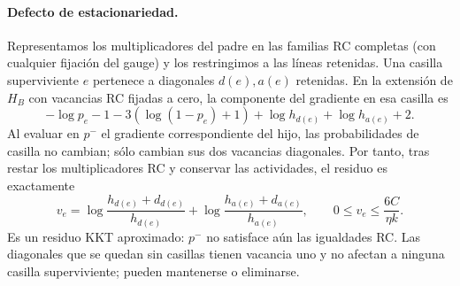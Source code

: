 \paragraph{Defecto de estacionariedad.}
Representamos los multiplicadores del padre en las familias RC completas
(con cualquier fijación del gauge) y los restringimos a las líneas retenidas.
Una casilla superviviente $e$ pertenece a diagonales $d(e),a(e)$ retenidas.
En la extensión de $H_B$ con vacancias RC fijadas a cero, la componente del gradiente en esa
casilla es
\[
 -\log p_e-1-3(\log(1-p_e)+1)
 +\log h_{d(e)}+\log h_{a(e)}+2.
\]
Al evaluar en $p^-$ el gradiente correspondiente del hijo, las probabilidades de
casilla no cambian; sólo cambian sus dos vacancias diagonales.
Por tanto, tras restar los multiplicadores RC y conservar las actividades,
el residuo es exactamente
\[
 v_e=\log\frac{h_{d(e)}+d_{d(e)}}{h_{d(e)}}
     +\log\frac{h_{a(e)}+d_{a(e)}}{h_{a(e)}},
 \qquad 0\le v_e\le\frac{6C}{\eta k}.
\]
Es un residuo KKT aproximado: $p^-$ no satisface aún las igualdades RC.
Las diagonales que se quedan sin casillas tienen vacancia uno y no afectan a
ninguna casilla superviviente; pueden mantenerse o eliminarse.

